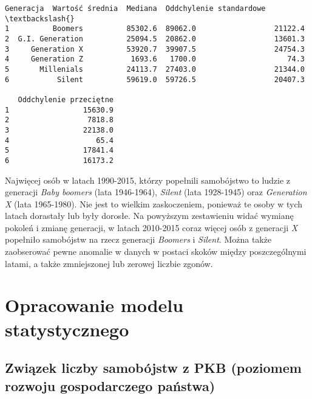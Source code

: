\documentclass[11pt]{article}
\makeatletter
\newcommand{\boxspacing}{\kern\kvtcb@left@rule\kern\kvtcb@boxsep}
\newcommand{\prompt}[4]{
        {\ttfamily\llap{{\color{#2}[#3]:\hspace{3pt}#4}}\vspace{-\baselineskip}}
    }
\makeatother
\begin{document}
            \begin{tcolorbox}[breakable, size=fbox, boxrule=.5pt, pad at break*=1mm, opacityfill=0]
\prompt{Out}{outcolor}{14}{\boxspacing}
\begin{Verbatim}[commandchars=\\\{\}]
         Generacja  Wartość średnia  Mediana  Oddchylenie standardowe  \textbackslash{}
1          Boomers          85302.6  89062.0                  21122.4
2  G.I. Generation          25094.5  20862.0                  13601.3
3     Generation X          53920.7  39907.5                  24754.3
4     Generation Z           1693.6   1700.0                     74.3
5       Millenials          24113.7  27403.0                  21344.0
6           Silent          59619.0  59726.5                  20407.3

   Oddchylenie przeciętne
1                 15630.9
2                  7818.8
3                 22138.0
4                    65.4
5                 17841.4
6                 16173.2
\end{Verbatim}
\end{tcolorbox}
        
    Najwięcej osób w latach 1990-2015, którzy popełnili samobójstwo to
ludzie z generacji \emph{Baby boomers} (lata 1946-1964), \emph{Silent}
(lata 1928-1945) oraz \emph{Generation X} (lata 1965-1980). Nie jest to
wielkim zaskoczeniem, ponieważ te osoby w tych latach dorastały lub były
dorosłe. Na powyższym zestawieniu widać wymianę pokoleń i zmianę
generacji, w latach 2010-2015 coraz więcej osób z generacji \emph{X}
popełniło samobójstw na rzecz generacji \emph{Boomers} i \emph{Silent}.
Można także zaobserować pewne anomalie w danych w postaci skoków między
poszczególnymi latami, a także zmniejszonej lub zerowej liczbie zgonów.

    \hypertarget{opracowanie-modelu-statystycznego}{%
\section{Opracowanie modelu
statystycznego}\label{opracowanie-modelu-statystycznego}}

    \hypertarget{zwiux105zek-liczby-samobuxf3jstw-z-pkb-poziomem-rozwoju-gospodarczego-paux144stwa}{%
\subsection{Związek liczby samobójstw z PKB (poziomem rozwoju
gospodarczego
państwa)}\label{zwiux105zek-liczby-samobuxf3jstw-z-pkb-poziomem-rozwoju-gospodarczego-paux144stwa}}
\end{document}
